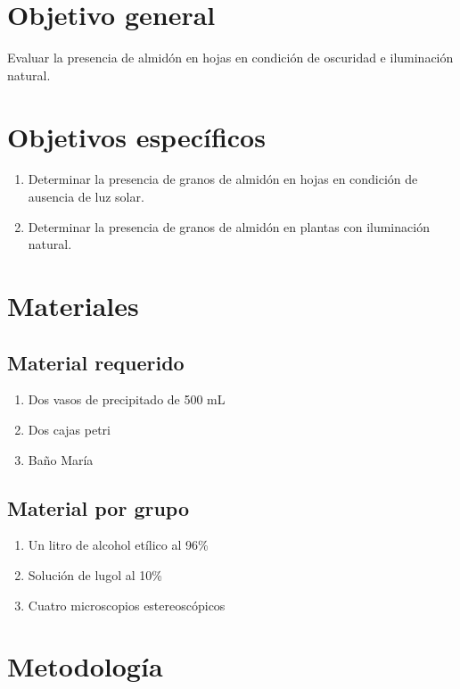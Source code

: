 \section{Objetivo general}

Evaluar la presencia de almid\'on en hojas en condici\'on de oscuridad e iluminaci\'on natural. 

\section{Objetivos espec\'ificos}

\begin{enumerate}
	\item Determinar la presencia de granos de almid\'on en hojas en condici\'on de ausencia de luz solar.
	\item Determinar la presencia de granos de almid\'on en plantas con iluminaci\'on natural.
\end{enumerate}

\section{Materiales}

\subsection{Material requerido}

\begin{enumerate}
	\item Dos vasos de precipitado de 500 mL 
	\item Dos cajas petri
	\item Ba\~no Mar\'ia
\end{enumerate}

\subsection{Material por grupo}

\begin{enumerate}
	\item Un litro de alcohol et\'ilico al 96\%
	\item Soluci\'on de lugol al 10\%
	\item Cuatro microscopios estereoscópicos
\end{enumerate}

\section{Metodolog\'ia}

